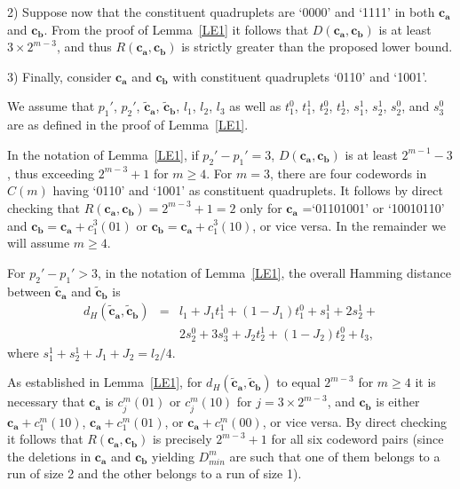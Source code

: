 2) Suppose now that the constituent quadruplets are `0000' and
`1111' in both $\mathbf{c_a}$ and $\mathbf{c_b}$. From the proof
of Lemma~\ref{LE1} it follows that $D(\mathbf{c_a},\mathbf{c_b})$
is at least $3 \times 2^{m-3}$, and thus
$R(\mathbf{c_a},\mathbf{c_b})$ is strictly greater than the
proposed lower bound.

3) Finally, consider $\mathbf{c_a}$ and $\mathbf{c_b}$ with
constituent quadruplets `0110' and `1001'.

We assume that $p_1'$, $p_2'$, $\mathbf{\tilde{c}_a}$,
$\mathbf{\tilde{c}_b}$, $l_1$, $l_2$, $l_3$ as well as $t_1^0$,
$t_1^1$, $t_2^0$, $t_2^1$, $s_{1}^1$, $s_{2}^1$, $s_{2}^0$, and
$s_{3}^0$ are as defined in the proof of Lemma~\ref{LE1}.

 In the notation of Lemma~\ref{LE1}, if
$p_2'-p_1' = 3$, $D(\mathbf{c_a},\mathbf{c_b})$ is at least
$2^{m-1}-3$, thus exceeding $2^{m-3}+1$ for $m \geq 4$. For $m =
3$, there are four codewords in $\hat{C}(m)$ having `0110' and
`1001' as constituent quadruplets. It follows by direct checking
that $R(\mathbf{c_a},\mathbf{c_b})=2^{m-3}+1=2$ only for
$\mathbf{{c}_a}$ =`01101001' or `10010110' and
$\mathbf{{c}_b}=\mathbf{{c}_a}+c_1^3(01)$ or
$\mathbf{{c}_b}=\mathbf{{c}_a}+c_1^3(10)$, or vice versa. In the
remainder we will assume $m \geq 4$.

For $p_2'-p_1' >3$, in the notation of Lemma~\ref{LE1}, the
overall Hamming distance between $\mathbf{\tilde{c}_a}$ and
$\mathbf{\tilde{c}_b}$ is
\begin{equation}\label{eq1}
\begin{array}{ccc}
d_H(\mathbf{\tilde{c}_a}, \mathbf{\tilde{c}_b}) &=&
l_1+J_1t_1^1+(1-J_1)t_1^0+s_{1}^1+2s_{2}^1+\\{}&{}&2s_{2}^0+3
s_{3}^0+J_2t_2^1+(1-J_2)t_2^0+l_3, \end{array}\end{equation} where
$s_{1}^1+s_{2}^1+J_1+J_2=l_2/4$.

As established in Lemma~\ref{LE1}, for $d_H(\mathbf{\tilde{c}_a},
\mathbf{\tilde{c}_b})$ to equal $2^{m-3}$ for $m \geq 4$ it is
necessary that $\mathbf{c_a}$ is $c_j^m(01)$ or $c_j^m(10)$ for
$j=3\times 2^{m-3}$, and $\mathbf{c_b}$ is either
$\mathbf{c_a}+c_1^m(10)$, $\mathbf{c_a}+c_1^m(01)$, or
$\mathbf{c_a}+c_1^m(00)$, or vice versa. By direct checking it
follows that $R(\mathbf{c_a},\mathbf{c_b})$ is precisely
$2^{m-3}+1$ for all six codeword pairs (since the deletions in
$\mathbf{c_a}$ and $\mathbf{c_b}$ yielding $D_{min}^m$ are such
that one of them belongs to a run of size 2 and the other belongs
to a run of size 1).


